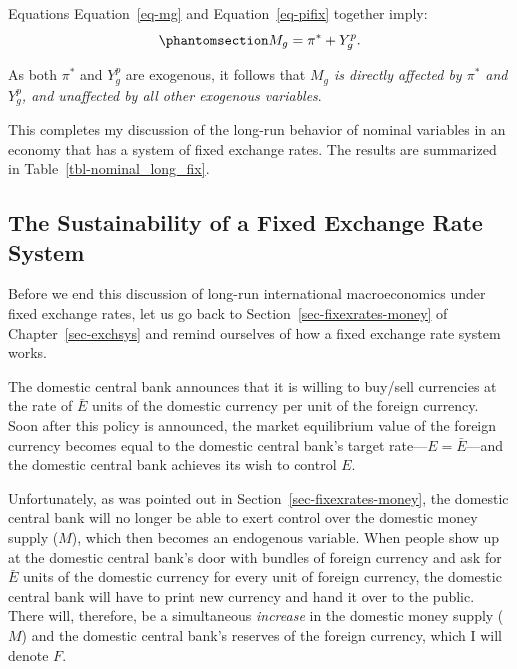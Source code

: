 \documentclass[
  letterpaper,
]{book}
\theoremstyle{plain}
\theoremstyle{remark}
\begin{document}
Equations Equation~\ref{eq-mg} and Equation~\ref{eq-pifix} together
imply: \begin{equation}\phantomsection\label{eq-mgfix}{
M_g=\pi^*+ Y^p_g.
}\end{equation}

As both \(\pi^*\) and \(Y^p_g\) are exogenous, it follows that
\emph{\(M_g\) is directly affected by \(\pi^*\) and \(Y^p_g\), and
unaffected by all other exogenous variables}.

This completes my discussion of the long-run behavior of nominal
variables in an economy that has a system of fixed exchange rates. The
results are summarized in Table~\ref{tbl-nominal_long_fix}.

\subsection{The Sustainability of a Fixed Exchange Rate
System}\label{sec-fixexsys-sustainability}


Before we end this discussion of long-run international macroeconomics
under fixed exchange rates, let us go back to
Section~\ref{sec-fixexrates-money} of Chapter~\ref{sec-exchsys} and
remind ourselves of how a fixed exchange rate system works.

The domestic central bank announces that it is willing to buy/sell
currencies at the rate of \(\bar{E}\) units of the domestic currency per
unit of the foreign currency. Soon after this policy is announced, the
market equilibrium value of the foreign currency becomes equal to the
domestic central bank's target rate---\(E=\bar{E}\)---and the domestic
central bank achieves its wish to control \(E\).

Unfortunately, as was pointed out in Section~\ref{sec-fixexrates-money},
the domestic central bank will no longer be able to exert control over
the domestic money supply (\(M\)), which then becomes an endogenous
variable. When people show up at the domestic central bank's door with
bundles of foreign currency and ask for \(\bar{E}\) units of the
domestic currency for every unit of foreign currency, the domestic
central bank will have to print new currency and hand it over to the
public. There will, therefore, be a simultaneous \emph{increase} in the
domestic money supply (\(M\)) and the domestic central bank's reserves
of the foreign currency, which I will denote \(F\).
\end{document}
